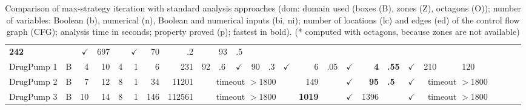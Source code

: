 \documentclass{llncs}
\newcommand{\pponly}[1]{}
\begin{document}
\begin{table}[t]
\begin{tabular}{|l|c|rrrr|rr|r@{}lc|r@{}lc|r@{}lc|r@{}lc|r@{}lc|r@{}lc|r@{}lc|}
\bf 242& &$\checkmark$& 697& &$\checkmark$& 70&.2 && 93&.5 &\\
DrugPump 1 &B&4&10&4&1&6&231& 92&.6 &$\checkmark$& 90&.3 &$\checkmark$& 
6& .05 &$\checkmark$&\bf 4&\bf.55 &$\checkmark$& 210& && 120& &\\
DrugPump 2 &B&7&12&8&1&34&11201& \multicolumn{6}{|c|}{timeout $>1800$} & 
149& &$\checkmark$& \bf 95&\bf.5 &$\checkmark$&
\multicolumn{6}{|c|}{timeout $>1800$}\\
DrugPump 3 &B&10&14&8&1&146&112561& \multicolumn{6}{|c|}{timeout $>1800$} & 
\bf 1019& &$\checkmark$& 1396& & $\checkmark$& \multicolumn{6}{|c|}{timeout $>1800$}\\
\hline
\end{tabular}~\\[2ex]
 \caption{\label{tab:exp2}
Comparison of max-strategy iteration with standard analysis approaches
(dom: domain used (boxes (B), zones (Z), octagons (O)); number of
variables: Boolean (b), numerical (n), Boolean and numerical inputs
(bi, ni); number of locations (lc) and edges (ed) of the control flow
graph (CFG); analysis time in seconds; property proved (p); fastest in
bold). (* computed with octagons, because zones are not available)
}
\end{table}



\pponly{\vspace*{-2ex}}
\end{document}
